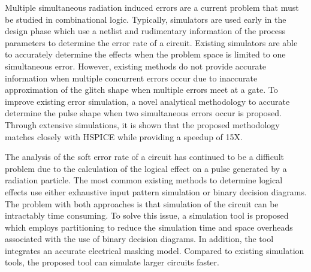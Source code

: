 Multiple simultaneous radiation induced errors are a current problem that must be studied in combinational logic. Typically, simulators are used early in the design phase which use a netlist and rudimentary information of the process parameters to determine the error rate of a circuit. Existing simulators are able to accurately determine the effects when the problem space is limited to one simultaneous error. However, existing methods do not provide accurate information when multiple concurrent errors occur due to inaccurate approximation of the glitch shape when multiple errors meet at a gate. To improve existing error simulation, a novel analytical methodology to accurate determine the pulse shape when two simultaneous errors occur is proposed. Through extensive simulations, it is shown that the proposed methodology matches closely with HSPICE while providing a speedup of 15X.

The analysis of the soft error rate of a circuit has continued to be a difficult problem due to the calculation of the logical effect on a pulse generated by a radiation particle. The most common existing methods to determine logical effects use either exhaustive input pattern simulation or binary decision diagrams. The problem with both approaches is that simulation of the circuit can be intractably time consuming. To solve this issue, a simulation tool is proposed which employs partitioning to reduce the simulation time and space overheads associated with the use of binary decision diagrams. In addition, the tool integrates an accurate electrical masking model. Compared to existing simulation tools, the proposed tool can simulate larger circuits faster.
\newpage

